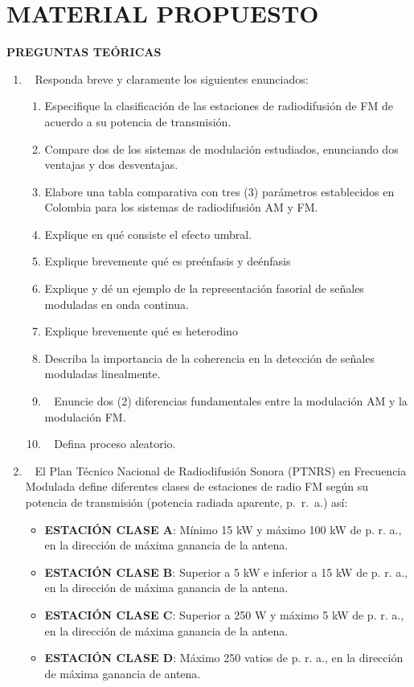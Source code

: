 \chapter{MATERIAL PROPUESTO}

\begin{center}
	\textbf{PREGUNTAS TEÓRICAS}
	\\
	
\end{center}

\begin{enumerate}
	\item~ Responda breve y claramente   los siguientes enunciados:
	\begin{enumerate}
		\item Especifique la clasificación de las estaciones de radiodifusión de FM de acuerdo a su potencia de transmisión.
		\item Compare dos de los sistemas de modulación estudiados, enunciando dos ventajas y dos desventajas.
		\item Elabore una tabla comparativa con tres (3) parámetros establecidos en Colombia para los sistemas de radiodifusión AM y FM.
		\item Explique en qué consiste el efecto umbral.
		\item Explique brevemente qué es preénfasis y deénfasis
		\item Explique y dé un ejemplo de la representación fasorial de señales moduladas en onda continua.
		\item Explique brevemente qué es heterodino
		\item Describa la importancia de la coherencia en la detección de señales moduladas linealmente.
		
		\item~ Enuncie dos (2) diferencias fundamentales entre la modulación AM y la modulación FM.
		\item~ Defina proceso aleatorio.
	\end{enumerate}



\item~ El Plan Técnico Nacional de Radiodifusión Sonora (PTNRS) en Frecuencia Modulada  define diferentes clases de estaciones de radio FM según su potencia de transmisión (potencia radiada aparente, p.~r.~a.) así:

\begin{itemize}
	\item \textbf{ESTACIÓN CLASE A}: Mínimo 15 kW y máximo 100 kW de p. r. a., en la dirección de máxima ganancia de la antena.
	\item \textbf{ESTACIÓN CLASE B}: Superior a 5 kW e inferior a 15 kW de p. r. a., en la dirección de máxima ganancia de la antena.
	\item \textbf{ESTACIÓN CLASE C}: Superior a 250 W y máximo 5 kW de p. r. a., en la dirección de máxima ganancia de la antena.
	\item \textbf{ESTACIÓN CLASE D}: Máximo 250 vatios de p. r. a., en la dirección de máxima ganancia de antena.
\end{itemize}


\end{enumerate}
